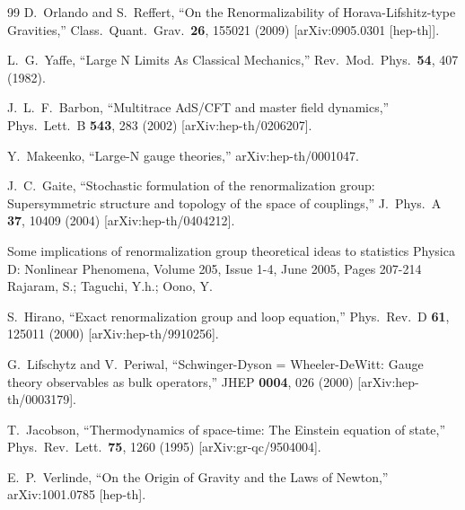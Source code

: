 \documentclass[12pt,epsbox]{article}
\numberwithin{equation}{section}
\begin{document}
\begin{thebibliography}{99}
  D.~Orlando and S.~Reffert,
  ``On the Renormalizability of Horava-Lifshitz-type Gravities,''
  Class.\ Quant.\ Grav.\  {\bf 26}, 155021 (2009)
  [arXiv:0905.0301 [hep-th]].

  L.~G.~Yaffe,
  ``Large N Limits As Classical Mechanics,''
  Rev.\ Mod.\ Phys.\  {\bf 54}, 407 (1982).

  J.~L.~F.~Barbon,
  ``Multitrace AdS/CFT and master field dynamics,''
  Phys.\ Lett.\  B {\bf 543}, 283 (2002)
  [arXiv:hep-th/0206207].

  Y.~Makeenko,
  ``Large-N gauge theories,''
  arXiv:hep-th/0001047.

  J.~C.~Gaite,
  ``Stochastic formulation of the renormalization group: Supersymmetric
  structure and topology of the space of couplings,''
  J.\ Phys.\ A  {\bf 37}, 10409 (2004)
  [arXiv:hep-th/0404212].

Some implications of renormalization group theoretical ideas to statistics
Physica D: Nonlinear Phenomena, Volume 205, Issue 1-4, June 2005, Pages 207-214
Rajaram, S.; Taguchi, Y.h.; Oono, Y.

  S.~Hirano,
  ``Exact renormalization group and loop equation,''
  Phys.\ Rev.\  D {\bf 61}, 125011 (2000)
  [arXiv:hep-th/9910256].

  G.~Lifschytz and V.~Periwal,
  ``Schwinger-Dyson = Wheeler-DeWitt: Gauge theory observables as bulk
  operators,''
  JHEP {\bf 0004}, 026 (2000)
  [arXiv:hep-th/0003179].

  T.~Jacobson,
  ``Thermodynamics of space-time: The Einstein equation of state,''
  Phys.\ Rev.\ Lett.\  {\bf 75}, 1260 (1995)
  [arXiv:gr-qc/9504004].

  E.~P.~Verlinde,
  ``On the Origin of Gravity and the Laws of Newton,''
  arXiv:1001.0785 [hep-th].



\end{thebibliography}
\end{document}
